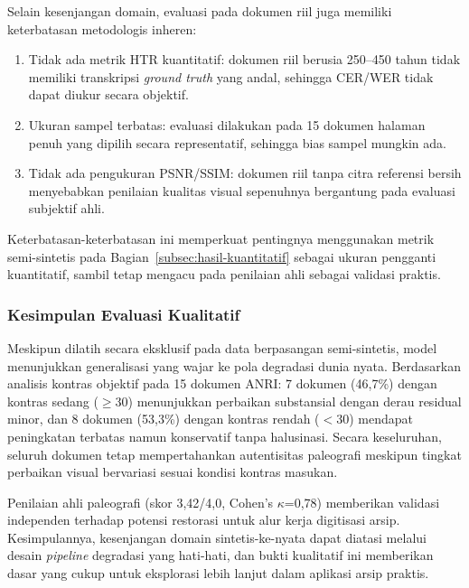 \documentclass[12pt,a4paper]{article}
\begin{document}
Selain kesenjangan domain, evaluasi pada dokumen riil juga memiliki keterbatasan metodologis inheren:
\begin{enumerate}[leftmargin=1.5em, labelsep=0.5em, itemindent=0pt, noitemsep, topsep=0pt]
    \item Tidak ada metrik HTR kuantitatif: dokumen riil berusia 250--450 tahun tidak memiliki transkripsi \textit{ground truth} yang andal, sehingga CER/WER tidak dapat diukur secara objektif.
    \item Ukuran sampel terbatas: evaluasi dilakukan pada 15 dokumen halaman penuh yang dipilih secara representatif, sehingga bias sampel mungkin ada.
    \item Tidak ada pengukuran PSNR/SSIM: dokumen riil tanpa citra referensi bersih menyebabkan penilaian kualitas visual sepenuhnya bergantung pada evaluasi subjektif ahli.
\end{enumerate}

Keterbatasan-keterbatasan ini memperkuat pentingnya menggunakan metrik semi-sintetis pada Bagian~\ref{subsec:hasil-kuantitatif} sebagai ukuran pengganti kuantitatif, sambil tetap mengacu pada penilaian ahli sebagai validasi praktis.

\subsubsection{Kesimpulan Evaluasi Kualitatif}
\label{subsubsec:kesimpulan-evaluasi-kualitatif}

Meskipun dilatih secara eksklusif pada data berpasangan semi-sintetis, model menunjukkan generalisasi yang wajar ke pola degradasi dunia nyata. Berdasarkan analisis kontras objektif pada 15 dokumen ANRI: 7 dokumen (46,7\%) dengan kontras sedang ($\geq$30) menunjukkan perbaikan substansial dengan derau residual minor, dan 8 dokumen (53,3\%) dengan kontras rendah ($<$30) mendapat peningkatan terbatas namun konservatif tanpa halusinasi. Secara keseluruhan, seluruh dokumen tetap mempertahankan autentisitas paleografi meskipun tingkat perbaikan visual bervariasi sesuai kondisi kontras masukan.

Penilaian ahli paleografi (skor 3,42/4,0, Cohen's $\kappa$=0,78) memberikan validasi independen terhadap potensi restorasi untuk alur kerja digitisasi arsip. Kesimpulannya, kesenjangan domain sintetis-ke-nyata dapat diatasi melalui desain \textit{pipeline} degradasi yang hati-hati, dan bukti kualitatif ini memberikan dasar yang cukup untuk eksplorasi lebih lanjut dalam aplikasi arsip praktis.
\end{document}
